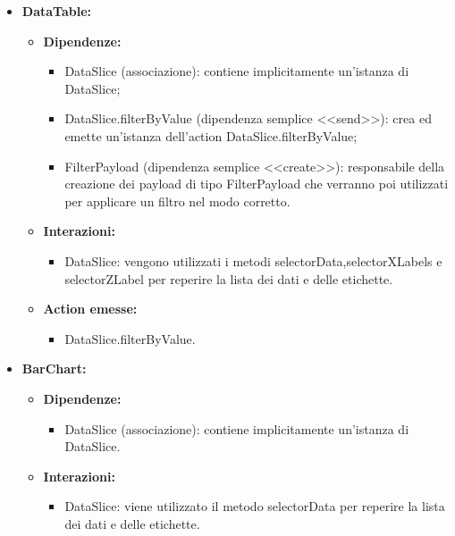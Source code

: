 \begin{itemize}
      \item \textbf{DataTable:}
            \begin{itemize}
                  \item \textbf{Dipendenze:}
                        \begin{itemize}
                              \item DataSlice (associazione): contiene implicitamente un'istanza di DataSlice;
                              \item DataSlice.filterByValue (dipendenza semplice <<send>>): crea ed emette
                                    un'istanza dell'action DataSlice.filterByValue;
                              \item FilterPayload (dipendenza semplice <<create>>): responsabile della creazione
                                    dei payload di tipo FilterPayload che verranno poi utilizzati per applicare un
                                    filtro nel modo corretto.
                        \end{itemize}
                  \item \textbf{Interazioni:}
                        \begin{itemize}
                              \item DataSlice: vengono utilizzati i metodi selectorData,selectorXLabels e
                                    selectorZLabel per reperire la lista dei dati e delle etichette.
                        \end{itemize}
                  \item \textbf{Action emesse:}
                        \begin{itemize}
                              \item DataSlice.filterByValue.
                        \end{itemize}
            \end{itemize}

      \item \textbf{BarChart:}
            \begin{itemize}
                  \item \textbf{Dipendenze:}
                        \begin{itemize}
                              \item DataSlice (associazione): contiene implicitamente un'istanza di DataSlice.
                        \end{itemize}
                  \item \textbf{Interazioni:}
                        \begin{itemize}
                              \item DataSlice: viene utilizzato il metodo selectorData per reperire la lista dei
                                    dati e delle etichette.
                        \end{itemize}
            \end{itemize}


\end{itemize}
